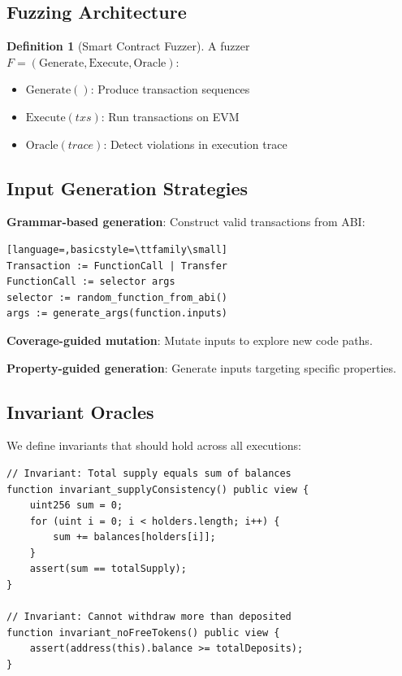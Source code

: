 \documentclass[11pt,a4paper]{article}
\theoremstyle{definition}
\newtheorem{definition}{Definition}
\begin{document}
\subsection{Fuzzing Architecture}

\begin{definition}[Smart Contract Fuzzer]
A fuzzer $F = (\text{Generate}, \text{Execute}, \text{Oracle})$:
\begin{itemize}
    \item $\text{Generate}()$: Produce transaction sequences
    \item $\text{Execute}(txs)$: Run transactions on EVM
    \item $\text{Oracle}(trace)$: Detect violations in execution trace
\end{itemize}
\end{definition}

\subsection{Input Generation Strategies}

\textbf{Grammar-based generation}: Construct valid transactions from ABI:
\begin{lstlisting}[language=,basicstyle=\ttfamily\small]
Transaction := FunctionCall | Transfer
FunctionCall := selector args
selector := random_function_from_abi()
args := generate_args(function.inputs)
\end{lstlisting}

\textbf{Coverage-guided mutation}: Mutate inputs to explore new code paths.

\textbf{Property-guided generation}: Generate inputs targeting specific properties.

\subsection{Invariant Oracles}

We define invariants that should hold across all executions:

\begin{lstlisting}
// Invariant: Total supply equals sum of balances
function invariant_supplyConsistency() public view {
    uint256 sum = 0;
    for (uint i = 0; i < holders.length; i++) {
        sum += balances[holders[i]];
    }
    assert(sum == totalSupply);
}

// Invariant: Cannot withdraw more than deposited
function invariant_noFreeTokens() public view {
    assert(address(this).balance >= totalDeposits);
}
\end{lstlisting}
\end{document}
